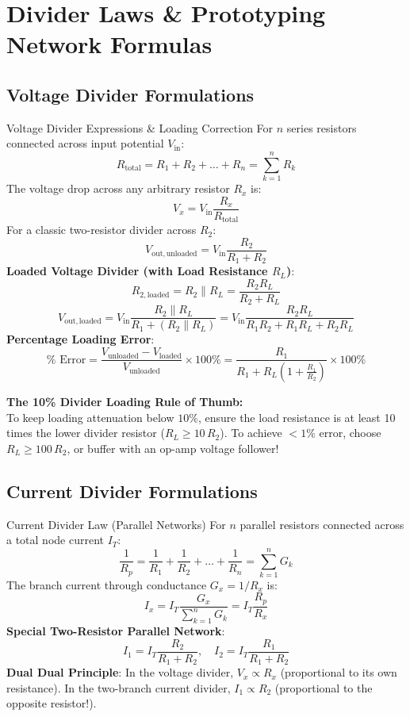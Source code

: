 \chapter{Divider Laws \& Prototyping Network Formulas}

\section{Voltage Divider Formulations}
\begin{formulabox}{Voltage Divider Expressions \& Loading Correction}
For $n$ series resistors connected across input potential $V_{\mathrm{in}}$:
\[ R_{\mathrm{total}} = R_1 + R_2 + \dots + R_n = \sum_{k=1}^n R_k \]
The voltage drop across any arbitrary resistor $R_x$ is:
\[ V_x = V_{\mathrm{in}} \frac{R_x}{R_{\mathrm{total}}} \]
For a classic two-resistor divider across $R_2$:
\[ V_{\mathrm{out,unloaded}} = V_{\mathrm{in}} \frac{R_2}{R_1 + R_2} \]
\textbf{Loaded Voltage Divider (with Load Resistance $R_L$)}:
\[ R_{2,\mathrm{loaded}} = R_2 \parallel R_L = \frac{R_2 R_L}{R_2 + R_L} \]
\[ V_{\mathrm{out,loaded}} = V_{\mathrm{in}} \frac{R_2 \parallel R_L}{R_1 + (R_2 \parallel R_L)} = V_{\mathrm{in}} \frac{R_2 R_L}{R_1 R_2 + R_1 R_L + R_2 R_L} \]
\textbf{Percentage Loading Error}:
\[ \%\text{ Error} = \frac{V_{\mathrm{unloaded}} - V_{\mathrm{loaded}}}{V_{\mathrm{unloaded}}} \times 100\% = \frac{R_1}{R_1 + R_L \left(1 + \frac{R_1}{R_2}\right)} \times 100\% \]
\end{formulabox}

\begin{memorytip}
\textbf{The 10\% Divider Loading Rule of Thumb:}\\
To keep loading attenuation below $10\%$, ensure the load resistance is at least 10 times the lower divider resistor ($R_L \ge 10\,R_2$). To achieve $< 1\%$ error, choose $R_L \ge 100\,R_2$, or buffer with an op-amp voltage follower!
\end{memorytip}

\section{Current Divider Formulations}
\begin{formulabox}{Current Divider Law (Parallel Networks)}
For $n$ parallel resistors connected across a total node current $I_T$:
\[ \frac{1}{R_p} = \frac{1}{R_1} + \frac{1}{R_2} + \dots + \frac{1}{R_n} = \sum_{k=1}^n G_k \]
The branch current through conductance $G_x = 1/R_x$ is:
\[ I_x = I_T \frac{G_x}{\sum_{k=1}^n G_k} = I_T \frac{R_p}{R_x} \]
\textbf{Special Two-Resistor Parallel Network}:
\[ I_1 = I_T \frac{R_2}{R_1 + R_2}, \quad I_2 = I_T \frac{R_1}{R_1 + R_2} \]
\textbf{Dual Dual Principle}: In the voltage divider, $V_x \propto R_x$ (proportional to its own resistance). In the two-branch current divider, $I_1 \propto R_2$ (proportional to the opposite resistor!).
\end{formulabox}
